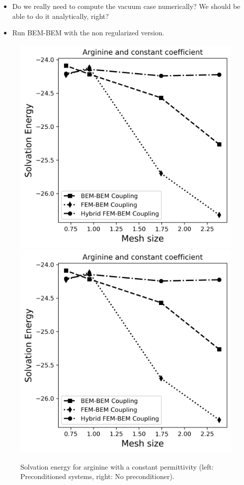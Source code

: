 \begin{itemize}
\item Do we really need to compute the vacuum case numerically? We should be able to do it analytically, right?
\item Run BEM-BEM with the non regularized version.
\end{itemize}


\begin{figure}
\centering
   \includegraphics[width=0.45\linewidth]{Arginine_const_coeff_error.png}
   \includegraphics[width=0.45\linewidth]{No_prec_Arginine_const_coeff_error.png}
\caption{Solvation energy for arginine with a constant permittivity (left: Preconditioned systems, right: No preconditioner).
}
\label{fig:arg_constant_energy}
\end{figure}

